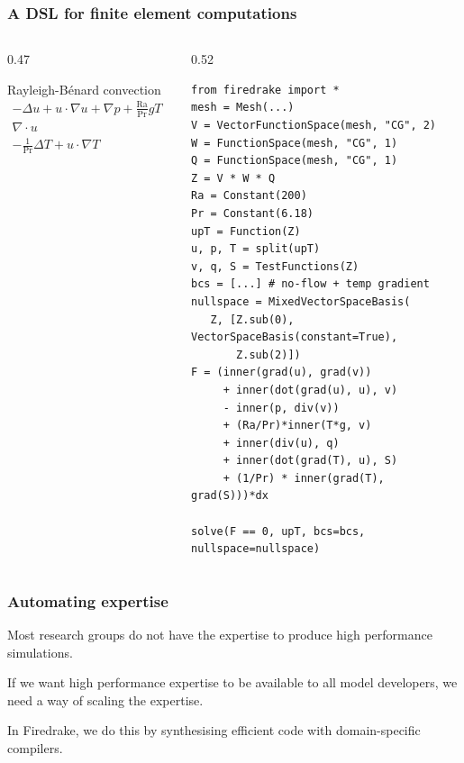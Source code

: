 \documentclass[presentation]{beamer}
\begin{document}
\begin{frame}[fragile]
  \frametitle{A DSL for finite element computations}
  \begin{columns}
    \begin{column}{0.47\framewidth}
      \small
      \begin{block}{Rayleigh-B\'enard convection}
        \begin{equation*}
          \begin{split}
            -\Delta u + u\cdot\nabla u + \nabla p +
            \frac{\text{Ra}}{\text{Pr}} \hat{g}T &= 0 \\
            \nabla \cdot u &= 0 \\
            - \frac{1}{\text{Pr}} \Delta T + u\cdot \nabla T &= 0
          \end{split}
        \end{equation*}
      \end{block}
    \end{column}
    \begin{column}{0.52\framewidth}
\begin{verbatim}
from firedrake import *
mesh = Mesh(...)
V = VectorFunctionSpace(mesh, "CG", 2)
W = FunctionSpace(mesh, "CG", 1)
Q = FunctionSpace(mesh, "CG", 1)
Z = V * W * Q
Ra = Constant(200)
Pr = Constant(6.18)
upT = Function(Z)
u, p, T = split(upT)
v, q, S = TestFunctions(Z)
bcs = [...] # no-flow + temp gradient
nullspace = MixedVectorSpaceBasis(
   Z, [Z.sub(0), VectorSpaceBasis(constant=True),
       Z.sub(2)])
F = (inner(grad(u), grad(v))
     + inner(dot(grad(u), u), v)
     - inner(p, div(v))
     + (Ra/Pr)*inner(T*g, v)
     + inner(div(u), q)
     + inner(dot(grad(T), u), S)
     + (1/Pr) * inner(grad(T), grad(S)))*dx

solve(F == 0, upT, bcs=bcs, nullspace=nullspace)
\end{verbatim}
    \end{column}
  \end{columns}  
\end{frame}

\begin{frame}
  \frametitle{Automating expertise}
  \begin{lemma}
    Most research groups do not have the expertise to produce high
    performance simulations.
  \end{lemma}
  \begin{corollary}
    If we want high performance expertise to be available to all model
    developers, we need a way of scaling the expertise.

    In Firedrake, we do this by synthesising efficient code with
    domain-specific compilers.
  \end{corollary}
\end{frame}
\end{document}
